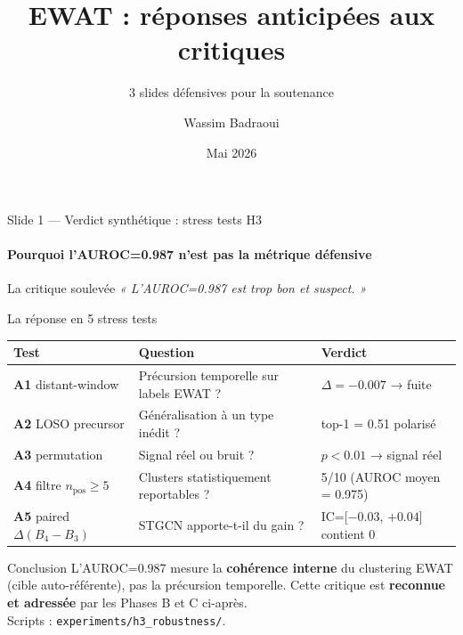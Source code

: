 \documentclass[10pt,aspectratio=169]{beamer}
\title[EWAT — Défense]{EWAT : réponses anticipées aux critiques}
\subtitle{3 slides défensives pour la soutenance}
\author{Wassim Badraoui}
\institute{Devoteam --- EPITA}
\date{Mai 2026}
\begin{document}
\begin{frame}
  \titlepage
\end{frame}

\begin{frame}{Slide 1 --- Verdict synthétique : stress tests H3}
  \framesubtitle{Pourquoi l'AUROC=0.987 n'est pas la métrique défensive}

  \begin{block}{La critique soulevée}
    \emph{« L'AUROC=0.987 est trop bon et suspect. »}
  \end{block}

  \begin{block}{La réponse en 5 stress tests}
    \scriptsize
    \begin{tabularx}{\linewidth}{l X l}
      \toprule
      \textbf{Test} & \textbf{Question} & \textbf{Verdict} \\
      \midrule
      \textbf{A1} distant-window     & Précursion temporelle sur labels EWAT ?   & \textcolor{ewatred}{$\Delta = -0.007$ → fuite} \\
      \textbf{A2} LOSO precursor     & Généralisation à un type inédit ?         & \textcolor{ewatred}{top-1 = 0.51 polarisé} \\
      \textbf{A3} permutation        & Signal réel ou bruit ?                    & \textcolor{ewatgreen}{$p < 0.01$ → signal réel} \\
      \textbf{A4} filtre $n_\text{pos} \geq 5$ & Clusters statistiquement reportables ?   & 5/10 (AUROC moyen = 0.975) \\
      \textbf{A5} paired $\Delta(B_4 - B_3)$ & STGCN apporte-t-il du gain ?               & \textcolor{ewatred}{IC=[$-0.03$, $+0.04$] contient 0} \\
      \bottomrule
    \end{tabularx}
  \end{block}

  \begin{block}{Conclusion}
    L'AUROC=0.987 mesure la \textbf{cohérence interne} du clustering EWAT (cible
    auto-référente), pas la précursion temporelle. Cette critique est
    \textbf{reconnue et adressée} par les Phases B et C ci-après.
    \\[0.3em]
    Scripts : \texttt{experiments/h3\_robustness/}.
  \end{block}
\end{frame}
\end{document}
